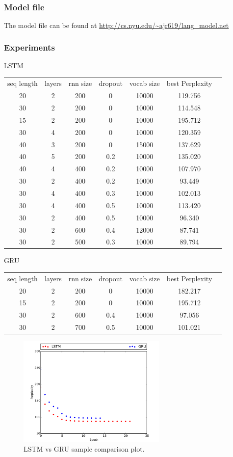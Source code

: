\documentclass{article}
\begin{document}
\subsubsection{Model file}
The model file can be found at \url{http://cs.nyu.edu/~ajr619/lang\_model.net}

\subsubsection{Experiments}
LSTM
\begin{center}
\begin{tabular}{c c c c c c c} 
seq length & layers & rnn size & dropout  & vocab size & best Perplexity\\
 20 & 2 & 200 & 0 &  10000 & 119.756\\ 
 30 & 2 & 200 & 0 &  10000 & 114.548\\ 
 15 & 2 & 200 & 0 &  10000 & 195.712\\ 
  30 & 4 & 200 & 0 & 10000 & 120.359\\
  40 & 3 & 200 & 0 & 15000 & 137.629\\
 40 & 5 & 200 & 0.2 & 10000 & 135.020\\
 40 & 4 & 400 & 0.2 & 10000 & 107.970\\
 30 & 2 & 400 & 0.2 & 10000 & 93.449\\
 30 & 4 & 400 & 0.3 & 10000 & 102.013\\
  30 & 4 & 400 & 0.5 & 10000 & 113.420\\
  
  30 & 2 & 400 & 0.5 &  10000 & 96.340\\
  30 & 2 & 600 & 0.4 &  12000 & 87.741\\  
  30 & 2 & 500 & 0.3 &  10000 & 89.794\\  
   
\end{tabular}
\end{center}

GRU

\begin{center}
\begin{tabular}{c c c c c c c} 
seq length & layers & rnn size & dropout & vocab size & best Perplexity\\
 20 & 2 & 200 & 0 &  10000 & 182.217\\ 
 15 & 2 & 200 & 0 &  10000 & 195.712\\ 
 30 & 2 & 600 & 0.4 &  10000 & 97.056\\
 30 & 2 & 700 & 0.5 & 10000 & 101.021\\  
\end{tabular}
\end{center}

\begin{figure}[ht!]
  \centering
  \includegraphics[width=0.65\textwidth]{lstmvsgru}
  \caption{LSTM vs GRU sample comparison plot.\label{fig:gru_cell}}
\end{figure}
\end{document}
